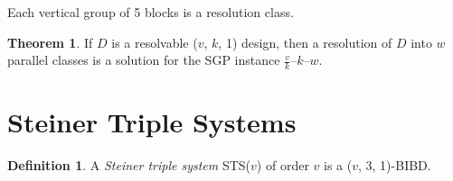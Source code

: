 \documentclass[12pt]{article}
\theoremstyle{definition}
\newtheorem{thm}{Theorem}[section]
\newtheorem{mydef}{Definition}
\begin{document}
\begin{center}
Each vertical group of 5 blocks is a resolution class.
\end{center}
\begin{thm}
If $D$ is a resolvable ($v$, $k$, 1) design, then a resolution of $D$ into $w$ parallel classes is a solution for the SGP instance $\frac{v}{k}$--$k$--$w$.
\end{thm}


\section{Steiner Triple Systems}
\begin{mydef}
A \textit{Steiner triple system} STS($v$) of order $v$ is a ($v$, 3, 1)-BIBD.
\end{mydef}

\clearpage


{}

\end{document}
